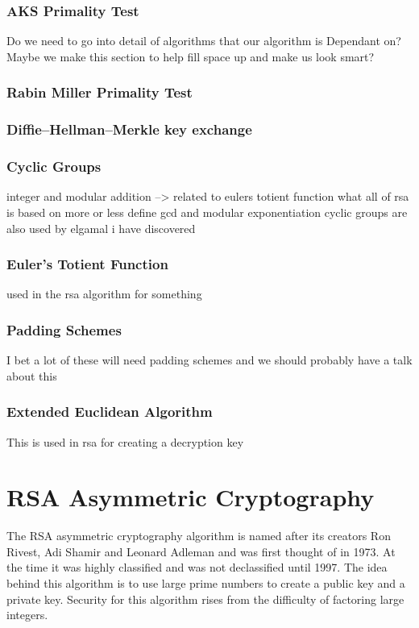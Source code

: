 \documentclass[conference]{IEEEtran}
\begin{document}
\subsubsection{AKS Primality Test}
Do we need to go into detail of algorithms that our algorithm is Dependant on?
Maybe we make this section to help fill space up and make us look smart?

\subsubsection{Rabin Miller Primality Test}

\subsubsection{Diffie–Hellman–Merkle key exchange}

\subsubsection{Cyclic Groups}
integer and modular addition --> related to eulers totient function
what all of rsa is based on more or less
define gcd and modular exponentiation
\newline
cyclic groups are also used by elgamal i have discovered

\subsubsection{Euler's Totient Function}
used in the rsa algorithm for something

\subsubsection{Padding Schemes}
I bet a lot of these will need padding schemes and we should probably have a talk about this


\subsubsection{Extended Euclidean Algorithm}
This is used in rsa for creating a decryption key

\color{black}


\section{RSA Asymmetric Cryptography}


The RSA asymmetric cryptography algorithm is named after its creators Ron Rivest, Adi Shamir and Leonard Adleman and was first thought of in 1973. 
At the time it was highly classified and was not declassified until 1997.
The idea behind this algorithm is to use large prime numbers to create a public key and a private key. 
Security for this algorithm rises from the difficulty of factoring large integers.
 
\end{document}
